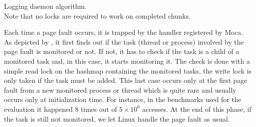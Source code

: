 \begin{algorithm}[htb]
    \caption[Moca Logging daemon algorithm.]{Logging daemon algorithm.\\
        \footnotesize{Note that no locks are required to work on completed chunks.}}
    \label{alg:moca-log}
    \begin{algorithmic}[1]
                \State {}
                \State {}
                \EndFor
            \EndFor
            \State {}
        \EndWhile
    \end{algorithmic}
\end{algorithm}


Each time a page fault occurs, it is trapped by the handler registered by \gls{Moca}.
As depicted by , it first finds out if the task (thread or process) involved by the page fault is monitored or not.
If not, it has to check if the task is a child of a monitored task and, in this case, it starts monitoring it.
The check is done with a simple read lock on the hashmap containing the monitored tasks, the write lock is only taken if the task must be added.
This last case occurs only at the first page fault from a new monitored process or thread which is quite rare and usually occurs only at initialization time.
For instance, in the benchmarks used for the evaluation it happened $8$ times out of $5\times10^6$ accesses.
At the end of this phase, if the task is still not monitored, we let Linux handle the page fault as usual.

